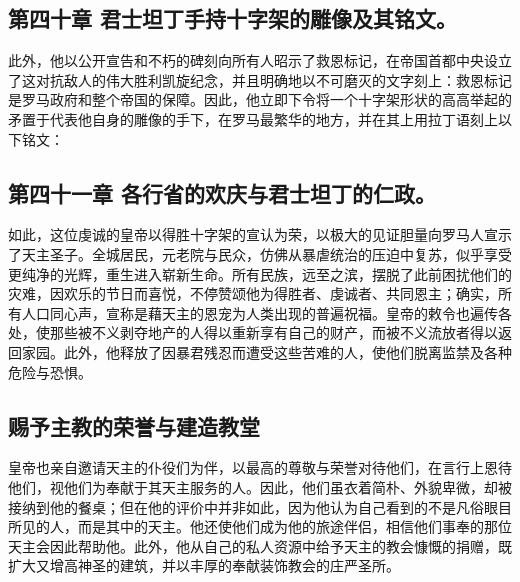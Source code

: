 
\subsection{第四十章 君士坦丁手持十字架的雕像及其铭文。}

此外，他以公开宣告和不朽的碑刻向所有人昭示了救恩标记，在帝国首都中央设立了这对抗敌人的伟大胜利凯旋纪念，并且明确地以不可磨灭的文字刻上：救恩标记是罗马政府和整个帝国的保障。因此，他立即下令将一个十字架形状的高高举起的矛置于代表他自身的雕像的手下，在罗马最繁华的地方，并在其上用拉丁语刻上以下铭文：\par


\subsection{第四十一章 各行省的欢庆与君士坦丁的仁政。}

如此，这位虔诚的皇帝以得胜十字架的宣认为荣，以极大的见证胆量向罗马人宣示了天主圣子。全城居民，元老院与民众，仿佛从暴虐统治的压迫中复苏，似乎享受更纯净的光辉，重生进入崭新生命。所有民族，远至之滨，摆脱了此前困扰他们的灾难，因欢乐的节日而喜悦，不停赞颂他为得胜者、虔诚者、共同恩主；确实，所有人口同心声，宣称是藉天主的恩宠为人类出现的普遍祝福。皇帝的敕令也遍传各处，使那些被不义剥夺地产的人得以重新享有自己的财产，而被不义流放者得以返回家园。此外，他释放了因暴君残忍而遭受这些苦难的人，使他们脱离监禁及各种危险与恐惧。\par


\subsection{赐予主教的荣誉与建造教堂}

皇帝也亲自邀请天主的仆役们为伴，以最高的尊敬与荣誉对待他们，在言行上恩待他们，视他们为奉献于其天主服务的人。因此，他们虽衣着简朴、外貌卑微，却被接纳到他的餐桌；但在他的评价中并非如此，因为他认为自己看到的不是凡俗眼目所见的人，而是其中的天主。他还使他们成为他的旅途伴侣，相信他们事奉的那位天主会因此帮助他。此外，他从自己的私人资源中给予天主的教会慷慨的捐赠，既扩大又增高神圣的建筑，并以丰厚的奉献装饰教会的庄严圣所。\par

